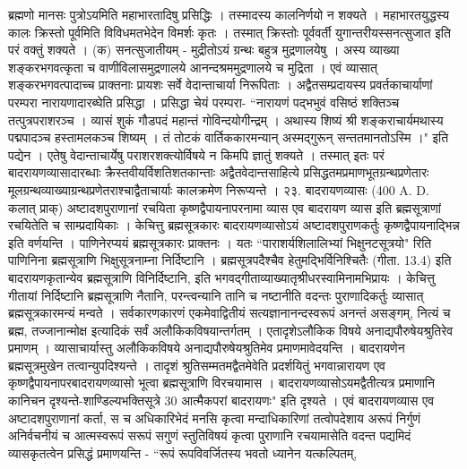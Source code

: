 ब्रह्मणो मानसः पुत्रोऽयमिति महाभारतादिषु प्रसिद्धिः । तस्मादस्य कालनिर्णयो न शक्यते । महाभारतयुद्धस्य कालः क्रिस्तो पूर्वमिति विविधमतभेदेन विमर्शः कृतः । तस्मात् क्रिस्तोः पूर्ववर्ती युगान्तरीयस्सनत्सुजात इति परं वक्तुं शक्यते ।
(क) सनत्सुजातीयम् - मुद्रीतोऽयं ग्रन्थः बहुत्र मुद्रणालयेषु । अस्य व्याख्या शङ्करभगवत्कृता च वाणीविलासमुद्रणालये आनन्दश्रममुद्रणालये च मुद्रिता ।
एवं व्यासात् शङ्करभगवत्पादाच्च प्राक्तनाः प्रायशः सर्वे वेदान्ताचार्या निरूपिताः । अद्वैतसम्प्रदायस्य प्रवर्तकाचार्याणां परम्परा नारायणादारब्घेति प्रसिद्धा । प्रसिद्धा चेयं परम्परा-
``नारायणं पद्भभुवं वसिष्ठं शक्तिञ्च तत्पुत्रपराशरञ्च ।
व्यासं शुकं गौडपदं महान्तं गोविन्दयोगीन्द्रम् ।
अथास्य शिष्यं श्री शङ्कराचार्यमथास्य पद्मपादञ्च हस्तामलकञ्च शिष्यम् ।
तं तोटकं वार्तिककारमन्यान् अस्मद्गुरून् सन्ततमानतोऽस्मि ।" इति पद्येन ।
एतेषु वेदान्ताचार्येषु पराशरशक्त्योर्विषये न किमपि ज्ञातुं शक्यते । तस्मात् इतः परं बादरायणव्यासादारब्धाः क्रैस्तवीयर्विशतिशतकान्ताः अद्वैतवेदान्तसाहित्ये प्रसिद्धतमप्रमाणभूतग्रन्थप्रणेतारः मूलग्रन्थव्याख्याग्रन्थप्रणेतराश्चाद्वैताचार्याः कालक्रमेण निरूप्यन्ते ।
२३. बादरायणव्यासः (400 A. D. कलात् प्राक्)
अष्टादशपुराणानां रचयिता कृष्णद्वैपायनापरनामा व्यास एव बादरायण व्यास इति ब्रह्मसूत्राणां रचयितेति च साम्प्रदायिकाः । केचित्तु ब्रह्मसूत्रकारः बादरायणव्यासोऽयं अष्टादशपुराणकर्तुः कृष्णद्वैपायनाद्भिन्न इति वर्णयन्ति । पाणिनेरप्ययं ब्रह्मसूत्रकारः प्राक्तनः । यतः ``पाराशर्यशिलालिभ्यां भिक्षुनटसूत्रयो" रिति पाणिनिना ब्रह्मसूत्राणि भिक्षुसूत्रनाम्ना निर्दिष्टानि । ब्रह्मसूत्रपदैश्चैव हेतुमद्भिर्विनिश्चितैः (गीता. 13.4) इति बादरायणकृतान्येव ब्रह्मसूत्राणि विनिर्दिष्टानि, इति भगवद्गीताव्याख्यातृश्रीधरस्वामिनामभिप्रायः । केचित्तु गीतायां निर्दिष्टानि ब्रह्मसूत्राणि नैतानि, परन्त्वन्यानि तानि च नष्टानीति वदन्तः पुराणादिकर्तुः व्यासात् ब्रह्मसूत्रकारमन्यं मन्वते ।
सर्वकारणकारणं एकमेवाद्वितीयं सत्यज्ञानानन्दस्वरूपं अनन्तं असङ्गम्, नित्यं च ब्रह्म, तज्जानान्मोक्ष इत्यादिकं सर्वं अलौकिकविषयान्तर्गतम् । एतादृशेऽलौकिक विषये अनाद्यपौरुषेयश्रुतिरेव प्रमाणम् । व्यासाचार्यास्तु अलौकिकविषये अनाद्यपौरुषेयश्रुतिमेव प्रमाणमावेदयन्ति । बादरायणेन ब्रह्मसूत्रमुखेन तत्वान्युपदिश्यन्ते । तादृशं श्रुतिसम्मतमद्वैतमेवेति प्रदर्शयितुं भगवान्नारायण एव कृष्णद्वैपायनापरबादरायणव्यासो भूत्वा ब्रह्मसूत्राणि विरचयामास । बादरायणव्यासोऽयमद्वैतीत्यत्र प्रमाणानि कानिचन दृश्यन्ते-शाण्डिल्यभक्तिसूत्रे 30 आत्मैकपरां बादरायणः" इति दृश्यते । एवं बादरायणव्यास एव अष्टादशपुराणानां कर्ता, स च अधिकारिभेदं मनसि कृत्वा मन्दाधिकारिणां तत्वोपदेशाय अरूपं निर्गुणं अनिर्वचनीयं च आत्मस्वरूपं सरूपं सगुणं स्तुतिविषयं कृत्वा पुराणानि रचयामासेति वदन्त पद्यमिदं व्यासकृतत्वेन प्रसिद्धं प्रमाणयन्ति -
``रूपं रूपविवर्जितस्य भवतो ध्यानेन यत्कल्पितम्,
